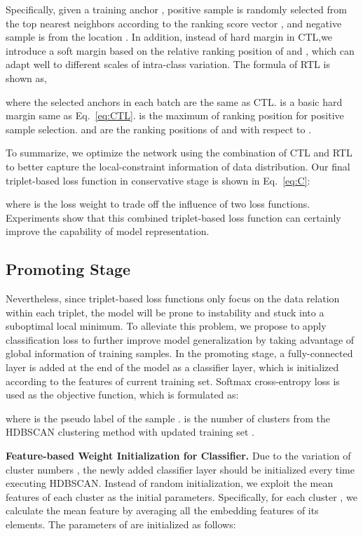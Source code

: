\documentclass[10pt,twocolumn,letterpaper]{article}
\begin{document}
Specifically, given a training anchor , positive sample  is randomly selected from the top  nearest neighbors according to the ranking score vector , and negative sample  is from the location . In addition, instead of hard margin in CTL,we introduce a soft margin based on the relative ranking position of  and , which can adapt well to different scales of intra-class variation. The formula of RTL is shown as,

where the selected anchors in each batch are the same as CTL.  is a basic hard margin same as Eq.~\eqref{eq:CTL}.  is the maximum of ranking position for positive sample selection.  and  are the ranking positions of  and  with respect to .

To summarize, we optimize the network using the combination of CTL and RTL to better capture the local-constraint information of data distribution. Our final triplet-based loss function in conservative stage is shown in Eq.~\eqref{eq:C}: 

where  is the loss weight to trade off the influence of two loss functions. Experiments show that this combined triplet-based loss function can certainly improve the capability of model representation.

\subsection{Promoting Stage}
Nevertheless, since triplet-based loss functions only focus on the data relation within each triplet, the model will be prone to instability and stuck into a suboptimal local minimum. 
To alleviate this problem, we propose to apply classification loss to further improve model generalization by taking advantage of global information of training samples. 
In the promoting stage, a fully-connected layer is added at the end of the model as a classifier layer, which is initialized according to the features of current training set. Softmax cross-entropy loss is used as the objective function, which is formulated as:

where  is the pseudo label of the sample .  is the number of clusters from the  HDBSCAN clustering method with updated training set .

\textbf{Feature-based Weight Initialization for Classifier.} 
Due to the variation of cluster numbers , the newly added classifier layer  should be initialized every time executing HDBSCAN. Instead of random initialization, we exploit the mean features of each cluster as the initial parameters. Specifically, for each cluster , we calculate the mean feature  by averaging all the embedding features of its elements. The parameters  of  are initialized as follows:
\end{document}
